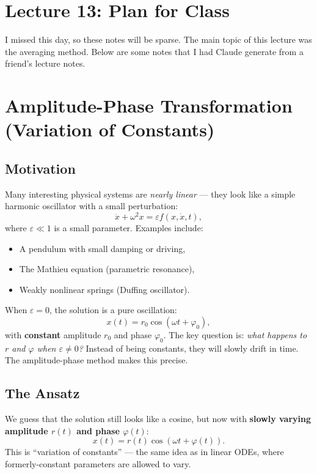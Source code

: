\documentclass{article}
\begin{document}
\section{Lecture 13: Plan for Class}

I missed this day, so these notes will be sparse. The main topic of this lecture was the averaging method. Below are some notes that I had Claude generate from a friend's lecture notes.

\section{Amplitude-Phase Transformation (Variation of Constants)}

\subsection{Motivation}

Many interesting physical systems are \textit{nearly linear} --- they look like a simple harmonic
oscillator with a small perturbation:
\[
    \ddot{x} + \omega^2 x = \varepsilon f(x, \dot{x}, t),
\]
where $\varepsilon \ll 1$ is a small parameter. Examples include:
\begin{itemize}
    \item A pendulum with small damping or driving,
    \item The Mathieu equation (parametric resonance),
    \item Weakly nonlinear springs (Duffing oscillator).
\end{itemize}

When $\varepsilon = 0$, the solution is a pure oscillation:
\[
    x(t) = r_0 \cos(\omega t + \varphi_0),
\]
with \textbf{constant} amplitude $r_0$ and phase $\varphi_0$. The key question is: \textit{what
happens to $r$ and $\varphi$ when $\varepsilon \neq 0$?} Instead of being constants, they will
slowly drift in time. The amplitude-phase method makes this precise.

\subsection{The Ansatz}

We guess that the solution still looks like a cosine, but now with \textbf{slowly varying amplitude
$r(t)$ and phase $\varphi(t)$}:
\[
    x(t) = r(t)\cos(\omega t + \varphi(t)).
\]
This is ``variation of constants'' --- the same idea as in linear ODEs, where formerly-constant
parameters are allowed to vary.
\end{document}
